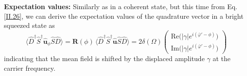 \noindent \textbf{Expectation values: } Similarly as in a coherent state, but this time from Eq. \ref{II.26}, we can derive the expectation values of the quadrature vector in a bright squeezed state as
\begin{equation}
\langle \hat{D}^\dagger  \hat S^\dagger \mathbf{\hat{\mathbf u}} _\phi  \hat S \hat D \rangle
= \mathbf R(\phi)\,\langle \hat{D}^\dagger  \hat S^\dagger \mathbf{\hat{\mathbf u}} \hat S \hat D\rangle
=
2 \delta (\Omega)\begin{pmatrix}
\mathrm{Re}\big( |\gamma| e^{i(\bar{\varphi}'-\phi)}\big) \\[2pt]
\mathrm{Im}\big(|\gamma| e^{i(\bar{\varphi}'-\phi)}\big)
\end{pmatrix}
\end{equation}
indicating that the mean field is shifted by the displaced amplitude $\gamma$ at the carrier frequency. \\

